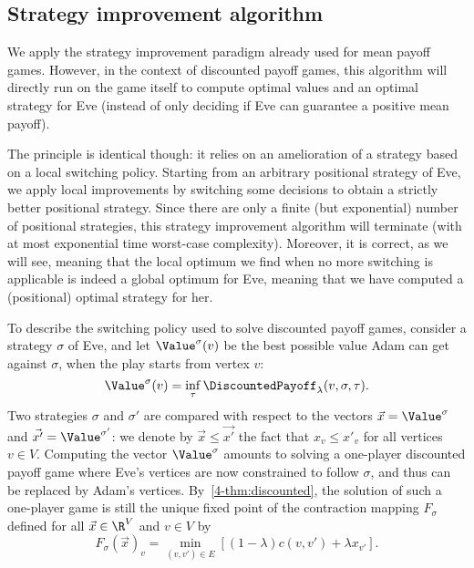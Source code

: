 \subsection*{Strategy improvement algorithm}

We apply the strategy improvement paradigm already used for
mean payoff games. However, in the context of discounted payoff games,
this algorithm will directly run on the game itself to compute optimal
values and an optimal strategy for Eve (instead of only deciding if
Eve can guarantee a positive mean payoff).

The principle is identical though: it relies on an amelioration of a
strategy based on a local switching policy. Starting from an arbitrary
positional strategy of Eve, we apply local improvements by switching
some decisions to obtain a strictly better positional strategy. Since
there are only a finite (but exponential) number of positional
strategies, this strategy improvement algorithm will terminate (with
at most exponential time worst-case complexity). Moreover, it is
correct, as we will see, meaning that the local optimum we find when
no more switching is applicable is indeed a global optimum for Eve,
meaning that we have computed a (positional) optimal strategy for her.

To describe the switching policy used to solve discounted payoff
games, consider a strategy $\sigma$ of Eve, and let $\Value^\sigma(v)$
be the best possible value Adam can get against $\sigma$, when the
play starts from vertex $v$:
\[\Value^\sigma(v) = \inf_\tau
  \DiscountedPayoff_\lambda(v,\sigma,\tau).\] Two strategies $\sigma$
and $\sigma'$ are compared with respect to the vectors
$\vec x=\Value^\sigma$ and $\vec{x'}=\Value^{\sigma'}$: we denote by
$\vec x\leq \vec{x'}$ the fact that $x_v\leq x'_v$ for all vertices
$v\in V$. Computing the vector $\Value^\sigma$ amounts to solving a
one-player discounted payoff game where Eve's vertices are now
constrained to follow $\sigma$, and thus can be replaced by Adam's
vertices. By~\cref{4-thm:discounted}, the solution of such a
one-player game is still the unique fixed point of the contraction
mapping $F_\sigma$ defined for all $\vec x\in \R^V$ and $v\in V$ by
\[F_\sigma(\vec x)_v = \min_{(v,v')\in E}[(1-\lambda)c(v,v')+\lambda x_{v'}].\]

